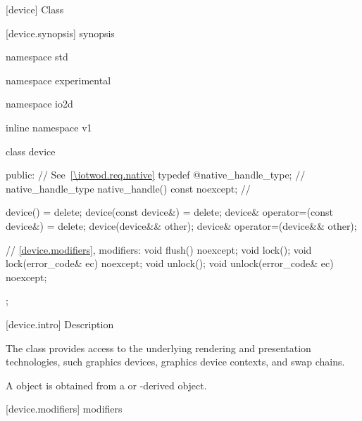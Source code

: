  [device] {Class }

 [device.synopsis] { synopsis}

\begin{codeblock}
namespace std { namespace experimental { namespace io2d { inline namespace v1 {
  class device {
  public:
    // See~\ref{\iotwod.req.native}
    typedef @\impdef@ native_handle_type; //              \expos
    native_handle_type native_handle() const noexcept; // \expos

    device() = delete;
    device(const device&) = delete;
    device& operator=(const device&) = delete;
    device(device&& other);
    device& operator=(device&& other);

    // \ref{device.modifiers}, modifiers:
    void flush() noexcept;
    void lock();
    void lock(error_code& ec) noexcept;
    void unlock();
    void unlock(error_code& ec) noexcept;
  };
} } } }
\end{codeblock}

 [device.intro] { Description}

\pnum
{}
The  class provides access to the underlying rendering and 
presentation technologies, such graphics devices, graphics device contexts, and swap chains.

\pnum
A  object is obtained from a  or -derived object.

 [device.modifiers] { modifiers}

